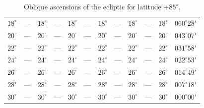 \begin{table}[!h]
{\begin{tabular}{cc|cc|cc|cc|cc|cc}
$18^\circ$ & --- & $18^\circ$ & --- & $18^\circ$ & --- & $18^\circ$ & --- &  $18^\circ$ & --- & $18^\circ$ & $060^\circ28'$\\
$20^\circ$ & --- & $20^\circ$ & --- & $20^\circ$ & --- & $20^\circ$ & --- &  $20^\circ$ & --- & $20^\circ$ & $043^\circ07'$\\
$22^\circ$ & --- & $22^\circ$ & --- & $22^\circ$ & --- & $22^\circ$ & --- &  $22^\circ$ & --- & $22^\circ$ & $031^\circ58'$\\
$24^\circ$ & --- & $24^\circ$ & --- & $24^\circ$ & --- & $24^\circ$ & --- &  $24^\circ$ & --- & $24^\circ$ & $022^\circ53'$\\
$26^\circ$ & --- & $26^\circ$ & --- & $26^\circ$ & --- & $26^\circ$ & --- &  $26^\circ$ & --- & $26^\circ$ & $014^\circ49'$\\
$28^\circ$ & --- & $28^\circ$ & --- & $28^\circ$ & --- & $28^\circ$ & --- &  $28^\circ$ & --- & $28^\circ$ & $007^\circ18'$\\
$30^\circ$ & --- & $30^\circ$ & --- & $30^\circ$ & --- & $30^\circ$ & --- &  $30^\circ$ & --- & $30^\circ$ & $000^\circ00'$\\
\end{tabular}}
\caption{Oblique ascensions of the ecliptic for latitude $+85^\circ$.}\label{ty}
\end{table}

